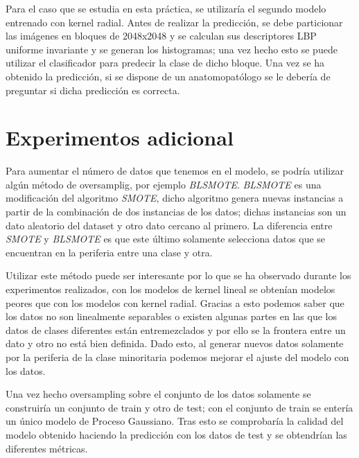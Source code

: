 Para el caso que se estudia en esta práctica, se utilizaría el segundo modelo entrenado con kernel radial. Antes de realizar la predicción, se debe particionar las imágenes en bloques de 2048x2048 y se calculan sus descriptores LBP uniforme invariante y se generan los histogramas; una vez hecho esto se puede utilizar el clasificador para predecir la clase de dicho bloque. Una vez se ha obtenido la predicción, si se dispone de un anatomopatólogo se le debería de preguntar si dicha predicción es correcta.

\section{Experimentos adicional}
Para aumentar el número de datos que tenemos en el modelo, se podría utilizar algún método de oversamplig, por ejemplo \textit{BLSMOTE}. \textit{BLSMOTE} es una modificación del algoritmo \textit{SMOTE}, dicho algoritmo genera nuevas instancias a partir de la combinación de dos instancias de los datos; dichas instancias son un dato aleatorio del dataset y otro dato cercano al primero. La diferencia entre \textit{SMOTE} y \textit{BLSMOTE} es que este último solamente selecciona datos que se encuentran en la periferia entre una clase y otra.\newline

Utilizar este método puede ser interesante por lo que se ha observado durante los experimentos realizados, con los modelos de kernel lineal se obtenían modelos peores que con los modelos con kernel radial. Gracias a esto podemos saber que los datos no son linealmente separables o existen algunas partes en las que los datos de clases diferentes están entremezclados y por ello se la frontera entre un dato y otro no está bien definida. Dado esto, al generar nuevos datos solamente por la periferia de la clase minoritaria podemos mejorar el ajuste del modelo con los datos.\newline

Una vez hecho oversampling sobre el conjunto de los datos solamente se construiría un conjunto de train y otro de test; con el conjunto de train se entería un único modelo de Proceso Gaussiano. Tras esto se comprobaría la calidad del modelo obtenido haciendo la predicción con los datos de test y se obtendrían las diferentes métricas.

